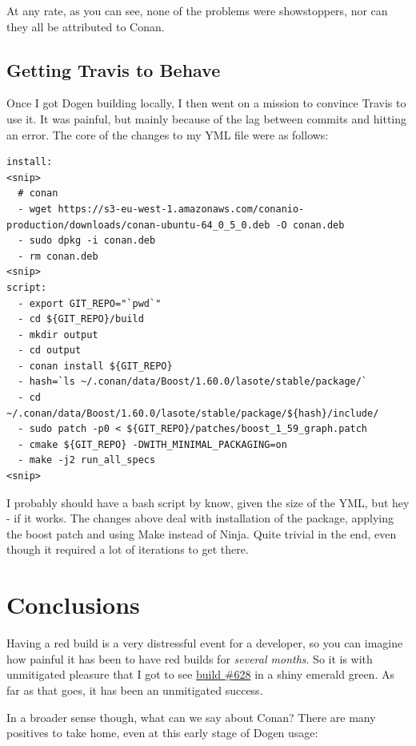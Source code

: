 \documentclass{book}
\begin{document}
At any rate, as you can see, none of the problems were showstoppers,
nor can they all be attributed to Conan.

\subsection*{Getting Travis to Behave}
\label{sec-3-3}

Once I got Dogen building locally, I then went on a mission to
convince Travis to use it. It was painful, but mainly because of the
lag between commits and hitting an error. The core of the changes to
my YML file were as follows:

\begin{verbatim}
install:
<snip>
  # conan
  - wget https://s3-eu-west-1.amazonaws.com/conanio-production/downloads/conan-ubuntu-64_0_5_0.deb -O conan.deb
  - sudo dpkg -i conan.deb
  - rm conan.deb
<snip>
script:
  - export GIT_REPO="`pwd`"
  - cd ${GIT_REPO}/build
  - mkdir output
  - cd output
  - conan install ${GIT_REPO}
  - hash=`ls ~/.conan/data/Boost/1.60.0/lasote/stable/package/`
  - cd ~/.conan/data/Boost/1.60.0/lasote/stable/package/${hash}/include/
  - sudo patch -p0 < ${GIT_REPO}/patches/boost_1_59_graph.patch
  - cmake ${GIT_REPO} -DWITH_MINIMAL_PACKAGING=on
  - make -j2 run_all_specs
<snip>
\end{verbatim}

I probably should have a bash script by know, given the size of the
YML, but hey - if it works. The changes above deal with installation
of the package, applying the boost patch and using Make instead of
Ninja. Quite trivial in the end, even though it required a lot of
iterations to get there.

\section*{Conclusions}
\label{sec-4}

Having a red build is a very distressful event for a developer, so you
can imagine how painful it has been to have red builds for \emph{several
months}. So it is with unmitigated pleasure that I got to see \href{https://travis-ci.org/DomainDrivenConsulting/dogen/builds/98304957}{build
\#628} in a shiny emerald green. As far as that goes, it has been an
unmitigated success.

In a broader sense though, what can we say about Conan? There are many
positives to take home, even at this early stage of Dogen usage:
\end{document}
